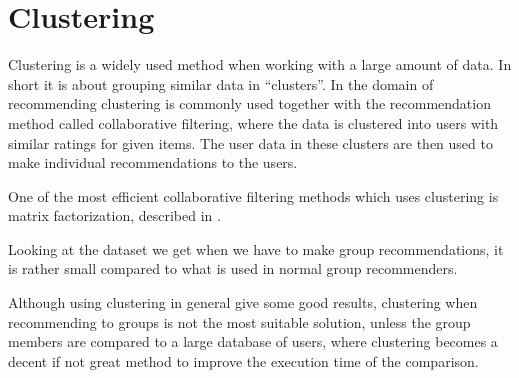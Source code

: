 \section{Clustering}\label{bg:clustering}
Clustering is a widely used method when working with a large amount of data. In short it is about grouping similar data in ``clusters''. In the domain of recommending clustering is commonly used together with the recommendation method called collaborative filtering, where the data is clustered into users with similar ratings for given items. The user data in these clusters are then used to make individual recommendations to the users.

One of the most efficient collaborative filtering methods which uses clustering is matrix factorization, described in . 

Looking at the dataset we get when we have to make group recommendations, it is rather small compared to what is used in normal group recommenders.

Although using clustering in general give some good results, clustering when recommending to groups is not the most suitable solution, unless the group members are compared to a large database of users, where clustering becomes a decent if not great method to improve the execution time of the comparison.




